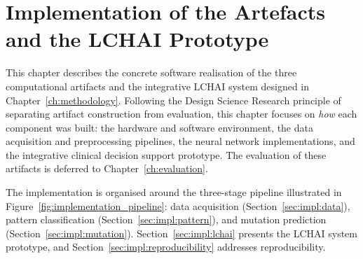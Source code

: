 
\chapter[Implementation]{Implementation of the Artefacts and the LCHAI Prototype}
\label{ch:implementation}

This chapter describes the concrete software realisation of the three computational artifacts and the integrative LCHAI system designed in Chapter~\ref{ch:methodology}.
Following the Design Science Research principle of separating artifact construction from evaluation, this chapter focuses on \emph{how} each component was built: the hardware and software environment, the data acquisition and preprocessing pipelines, the neural network implementations, and the integrative clinical decision support prototype.
The evaluation of these artifacts is deferred to Chapter~\ref{ch:evaluation}.

The implementation is organised around the three-stage pipeline illustrated in Figure~\ref{fig:implementation_pipeline}: data acquisition (Section~\ref{sec:impl:data}), pattern classification (Section~\ref{sec:impl:pattern}), and mutation prediction (Section~\ref{sec:impl:mutation}).
Section~\ref{sec:impl:lchai} presents the LCHAI system prototype, and Section~\ref{sec:impl:reproducibility} addresses reproducibility.

